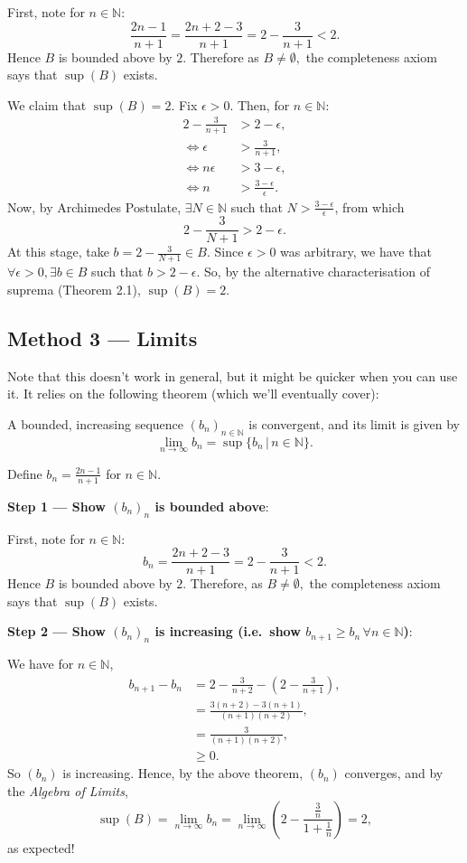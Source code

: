 \documentclass[
  17pt,
  a4paper]{extarticle}
\theoremstyle{plain}
\theoremstyle{definition}
\theoremstyle{plain}
\theoremstyle{plain}
\theoremstyle{plain}
\theoremstyle{plain}
\theoremstyle{definition}
\theoremstyle{definition}
\newtheorem*{Order Axioms*}{Order Axioms}\newtheorem{Order Axioms}{Order Axioms}[section]
\theoremstyle{remark}
\theoremstyle{remark}
\let\BeginKnitrBlock\begin \let\EndKnitrBlock\end
\renewcommand{\;}{\,}
\begin{document}
\BeginKnitrBlock{solution*}
First, note for \(n\in\mathbb{N}\): \[\frac{2n-1}{n+1} = \frac{2n+2-3}{n+1} = 2 - \frac{3}{n+1} < 2.\] Hence \(B\) is bounded above by \(2\). Therefore as \(B \neq \emptyset,\) the completeness axiom says that \(\sup(B)\) exists.

We claim that \(\sup(B) = 2.\) Fix \(\epsilon > 0.\) Then, for \(n \in \mathbb{N}:\)
\begin{align*}
2 - \frac{3}{n+1} &> 2-\epsilon,\\
\Leftrightarrow \epsilon &> \frac{3}{n+1},\\
\Leftrightarrow n\epsilon &> 3 - \epsilon,\\
\Leftrightarrow n &> \frac{3-\epsilon}{\epsilon}.
\end{align*}
Now, by Archimedes Postulate, \(\exists N \in \mathbb{N}\) such that \(N > \frac{3-\epsilon}{\epsilon}\), from which \[2 - \frac{3}{N+1} > 2- \epsilon.\] At this stage, take \(b = 2 - \frac{3}{N+1} \in B\). Since \(\epsilon > 0\) was arbitrary, we have that \(\forall \epsilon > 0, \exists b \in B\) such that \(b > 2-\epsilon.\) So, by the alternative characterisation of suprema (Theorem 2.1), \(\sup(B) = 2.\)
\EndKnitrBlock{solution*}

\hypertarget{method-3-limits}{%
\subsection*{Method 3 --- Limits}\label{method-3-limits}}

Note that this doesn't work in general, but it might be quicker when you can use it. It relies on the following theorem (which we'll eventually cover):
\BeginKnitrBlock{theorem}
{\label{thm:unnamed-chunk-5} }A bounded, increasing sequence \((b_n)_{n \in \mathbb{N}}\) is convergent, and its limit is given by \[\lim_{n \to \infty} b_n = \sup\lbrace b_n \,\lvert\, n \in \mathbb{N} \rbrace.\]
\EndKnitrBlock{theorem}

\BeginKnitrBlock{solution*}
Define \(b_n = \frac{2n - 1}{n+1}\) for \(n \in \mathbb{N}\).

\textbf{Step 1 --- Show \((b_n)_n\) is bounded above}:

First, note for \(n\in\mathbb{N}\): \[b_n = \frac{2n+2-3}{n+1} = 2 - \frac{3}{n+1} < 2.\] Hence \(B\) is bounded above by \(2\). Therefore, as \(B \neq \emptyset,\) the completeness axiom says that \(\sup(B)\) exists.

\textbf{Step 2 --- Show \((b_n)_n\) is increasing (i.e.~show \(b_{n+1} \geq b_n \; \forall n \in \mathbb{N}\))}:

We have for \(n \in \mathbb{N}\),
\begin{align*}
b_{n+1} - b_{n} &= 2 - \frac{3}{n+2} - \left(2 - \frac{3}{n+1}\right),\\
&= \frac{3(n+2)-3(n+1)}{(n+1)(n+2)},\\
&= \frac{3}{(n+1)(n+2)},\\
&\geq 0.
\end{align*}
So \((b_n)\) is increasing. Hence, by the above theorem, \((b_n)\) converges, and by the \emph{Algebra of Limits}, \[\sup(B) = \lim_{n \to \infty} b_n = \lim_{n \to \infty} \left(2 - \frac{\frac{3}{n}}{1 + \frac{1}{n}}\right) = 2,\]
as expected!
\EndKnitrBlock{solution*}
\end{document}
